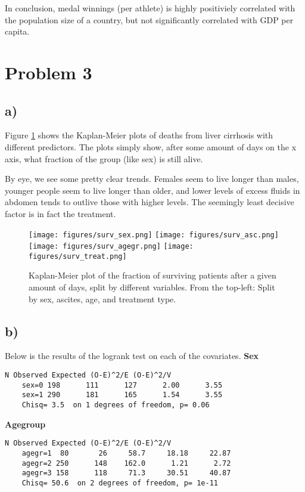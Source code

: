 \documentclass[a4paper, twocolumn]{article}
\begin{document}
In conclusion, medal winnings (per athlete) is highly positiviely correlated with the population size of a country, but not significantly correlated with GDP per capita.


\section*{Problem 3}
\subsection*{a)}
Figure \ref{fig:surv} shows the Kaplan-Meier plots of deaths from liver cirrhosis with different predictors. The plots simply show, after some amount of days on the x axis, what fraction of the group (like sex) is still alive.

By eye, we see some pretty clear trends. Females seem to live longer than males, younger people seem to live longer than older, and lower levels of excess fluids in abdomen tends to outlive those with higher levels. The seemingly least decisive factor is in fact the treatment.

\begin{figure}[h!]
    \texttt{[image: figures/surv\_sex.png]}
    \texttt{[image: figures/surv\_asc.png]}
    \texttt{[image: figures/surv\_agegr.png]}
    \texttt{[image: figures/surv\_treat.png]}
    \caption{Kaplan-Meier plot of the fraction of surviving patients after a given amount of days, split by different variables. From the top-left: Split by sex, ascites, age, and treatment type.}
    \label{fig:surv}
\end{figure}


\subsection*{b)}
Below is the results of the logrank test on each of the covariates.
\textbf{Sex}
\begin{Verbatim}[fontsize=\scriptsize]
            N Observed Expected (O-E)^2/E (O-E)^2/V
    sex=0 198      111      127      2.00      3.55
    sex=1 290      181      165      1.54      3.55
    Chisq= 3.5  on 1 degrees of freedom, p= 0.06 
\end{Verbatim}

\textbf{Agegroup}
\begin{Verbatim}[fontsize=\scriptsize]
            N Observed Expected (O-E)^2/E (O-E)^2/V
    agegr=1  80       26     58.7     18.18     22.87
    agegr=2 250      148    162.0      1.21      2.72
    agegr=3 158      118     71.3     30.51     40.87
    Chisq= 50.6  on 2 degrees of freedom, p= 1e-11 
\end{Verbatim}
\end{document}

